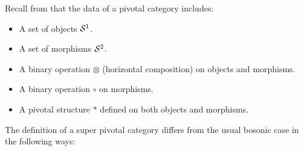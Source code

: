 Recall from 
\cite{Joyal1991}
that the data of a pivotal category includes:
\begin{itemize}
\item A set of objects $\mathcal{S}^1$.
\item A set of morphisms $\mathcal{S}^2$.
\item A binary operation $\otimes$ (horizontal composition) on objects and morphisms.
\item A binary operation $\circ$ on morphisms.
\item A pivotal structure $*$ defined on both objects and morphisms.
\end{itemize}


The definition of a super pivotal category differs from the usual bosonic case in the following ways:

